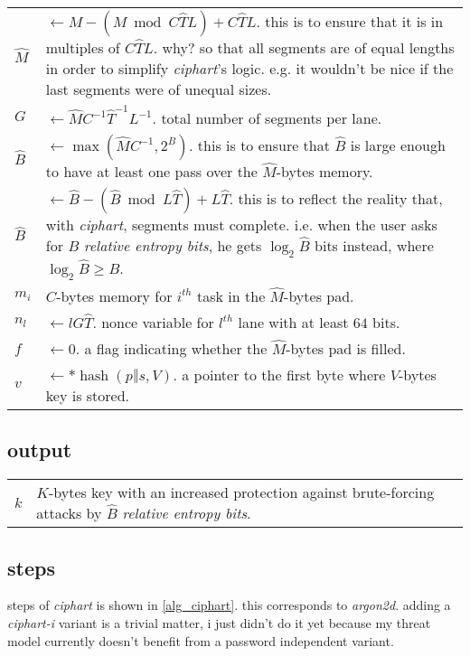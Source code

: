 \documentclass[twocolumn]{article}
\DeclareMathOperator{\maxf}{max}
\DeclareMathOperator{\hash}{hash}
\begin{document}
\begin{tabularx}{\columnwidth}{lX}
    $\hat M$    & $\gets M - (M \bmod C\hat TL) + C\hat TL$.  this is to
                    ensure that it is in multiples of $C\hat TL$.  why?  so
                    that all segments are of equal lengths in order to
                    simplify \emph{ciphart}'s logic.  e.g. it wouldn't be
                    nice if the last segments were of unequal sizes.\\
    $G$         & $\gets \hat MC^{-1}\hat T^{-1}L^{-1}$.  total number of
                    segments per lane.\\
    $\hat B$    & $\gets \maxf(\hat MC^{-1}, 2^B)$.  this is to ensure
                    that $\hat B$ is large enough to have at least one pass
                    over the $\hat M$-bytes memory.\\
    $\hat B$    & $\gets \hat B - (\hat B \bmod L\hat T) +
                    L\hat T$.  this is to reflect the reality that, with
                    \emph{ciphart}, segments must complete.  i.e. when the
                    user asks for $B$ \emph{relative entropy bits}, he gets
                    $\log_2 \hat B$ bits instead, where $\log_2\hat B \ge
                    B$.\\
    $m_i$       & $C$-bytes memory for $i^{th}$ task in the $\hat M$-bytes
                    pad.\\
    $n_l$       & $\gets lG\hat T$.  nonce variable for $l^{th}$ lane with
                    at least $64$ bits.\\
    $f$         & $\gets 0$.  a flag indicating whether the $\hat M$-bytes
                    pad is filled.\\
    $v$         & $\gets *\hash(p \mathbin\Vert s, V)$.  a pointer to the
                    first byte where $V$-bytes key is stored.\\
\end{tabularx}

\subsection{output}
\begin{tabularx}{\columnwidth}{lX}
$k$ & $K$-bytes key with an increased protection against brute-forcing
attacks by $\hat B$ \emph{relative entropy bits}.\\
\end{tabularx}

\subsection{steps}
steps of \emph{ciphart} is shown in \cref{alg_ciphart}.  this corresponds
to \emph{argon2d}.  adding a \emph{ciphart-i} variant is a trivial matter,
i just didn't do it yet because my threat model currently doesn't benefit
from a password independent variant.
\end{document}

